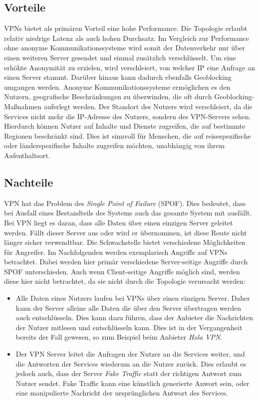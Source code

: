 \subsection{Vorteile}
\label{chap:vpn_advantages}

VPNs bietet als primären Vorteil eine hohe Performance. Die Topologie erlaubt relativ niedrige Latenz als auch hohen Durchsatz. Im Vergleich zur Performance ohne anonyme Kommunikationssysteme wird somit der Datenverkehr nur über einen weiteren Server gesendet und einmal zusätzlich verschlüsselt.
Um eine erhöhte Anonymität zu erzielen, wird verschleiert, von welcher IP eine Anfrage an einen Server stammt. Darüber hinaus kann dadurch ebenfalls Geoblocking umgangen werden. Anonyme Kommunikationssysteme ermöglichen es den Nutzern, geografische Beschränkungen zu überwinden, die oft durch Geoblocking-Maßnahmen auferlegt werden. Der Standort des Nutzers wird verschleiert, da die Services nicht mehr die IP-Adresse des Nutzers, sondern des VPN-Servers sehen. Hierdurch können Nutzer auf Inhalte und Dienste zugreifen, die auf bestimmte Regionen beschränkt sind. Dies ist sinnvoll für Menschen, die auf reisespezifische oder länderspezifische Inhalte zugreifen möchten, unabhängig von ihrem Aufenthaltsort.

\subsection{Nachteile}
\label{chap:vpn_disadvantages}

VPN hat das Problem des \textit{Single Point of Failure} (SPOF). Dies bedeutet, dass bei Ausfall eines Bestandteils des Systems auch das gesamte System mit ausfällt. Bei VPN liegt es daran, dass alle Daten über einen einzigen Server geleitet werden. Fällt dieser Server aus oder wird er übernommen, ist diese Route nicht länger sicher verwendtbar\cite{AttacksOnVPNs}.
Die Schwachstelle bietet verschiedene Möglichkeiten für Angreifer. Im Nachfolgenden werden exemplarisch Angriffe auf VPNs betrachtet. Dabei werden hier primär verschiedene Server-seitige Angriffe durch SPOF unterschieden. Auch wenn Client-seitige Angriffe möglich sind, werden diese hier nicht betrachtet, da sie nicht durch die Topologie verursacht werden:

\begin{itemize}
    \item Alle Daten eines Nutzers laufen bei VPNs über einen einzigen Server. Daher kann der Server alleine alle Daten die über den Server übertragen werden auch entschlüsseln. Dies kann dazu führen, dass der Anbieter die Nachrichten der Nutzer mitlesen und entschlüsseln kann. Dies ist in der Vergangenheit bereits der Fall gewesen, so zum Beispiel beim Anbieter \textit{Hola VPN}\cite{VPNCriticalSurvey}.
    \item Der VPN Server leitet die Anfragen der Nutzer an die Services weiter, und die Antworten der Services wiederum an die Nutzer zurück. Dies erlaubt es jedoch auch, dass der Server \textit{Fake Traffic} statt der richtigen Antwort zum Nutzer sendet. Fake Traffic kann eine künstlich generierte Anwort sein, oder eine manipulierte Nachricht der ursprünglichen Antwort des Services.
\end{itemize}
